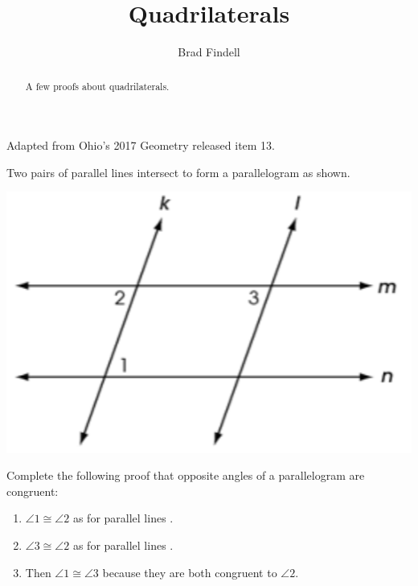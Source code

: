 \documentclass[nooutcomes]{ximera}
\title{Quadrilaterals}
\author{Brad Findell}
\begin{document}
\begin{abstract}
A few proofs about quadrilaterals. 
\end{abstract}
\maketitle


\begin{problem}
Adapted from Ohio's 2017 Geometry released item 13. 

Two pairs of parallel lines intersect to form a parallelogram as shown.  
\begin{image}
\includegraphics{Q13.png}
\end{image}
Complete the following proof that opposite angles of a parallelogram are congruent: 

\begin{enumerate}
\item $\angle 1 \cong \angle 2$ as 
for parallel lines .
\item $\angle 3 \cong \angle 2$ as for parallel lines .
\item Then $\angle 1 \cong \angle 3$ because they are both congruent 
to $\angle 2$. 
\end{enumerate}
\end{problem}
\end{document}
